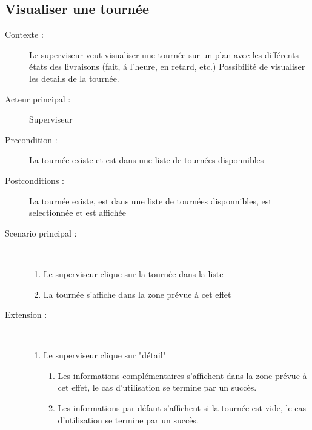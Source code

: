 \subsection{Visualiser une tourn\'ee}
\begin{description}
    \item[Contexte :] Le superviseur veut visualiser une tourn\'ee sur un plan avec les diff\'erents \'etats des livraisons (fait, \'a l'heure, en retard, etc.) Possibilit\'e de visualiser les details de la tourn\'ee.
    \item[Acteur principal :] Superviseur
    \item[Precondition :] La tourn\'ee existe et est dans une liste de tourn\'ees disponnibles
    \item[Postconditions :] La tourn\'ee existe, est dans une liste de tourn\'ees disponnibles, est selectionn\'ee et est affich\'ee
    \item[Scenario principal :] ~
    \begin{enumerate}
        \item Le superviseur clique sur la tourn\'ee dans la liste
        \item La tourn\'ee s'affiche dans la zone pr\'evue \`a cet effet
    \end{enumerate}
    \item[Extension :] ~
    \begin{enumerate}
        \item Le superviseur clique sur "d\'etail"
        \begin{enumerate}
            \item Les informations compl\'ementaires s'affichent dans la zone pr\'evue \`a cet effet, le cas d'utilisation se termine par un succ\`es.
            \item Les informations par d\'efaut s'affichent si la tourn\'ee est vide, le cas d'utilisation se termine par un succ\`es.
        \end{enumerate}
    \end{enumerate}
\end{description}


